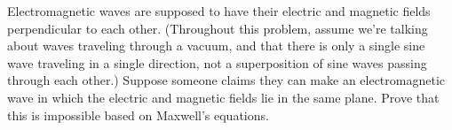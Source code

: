 Electromagnetic waves are supposed to have their electric and magnetic fields
perpendicular to each other. (Throughout this problem, assume we're talking about
waves traveling through a vacuum, and that there is only a single sine wave traveling
in a single direction, not a superposition of sine waves passing through each other.)
Suppose someone claims they can make an electromagnetic wave in which the electric
and magnetic fields lie in the same plane. Prove that this is impossible based on
Maxwell's equations.
